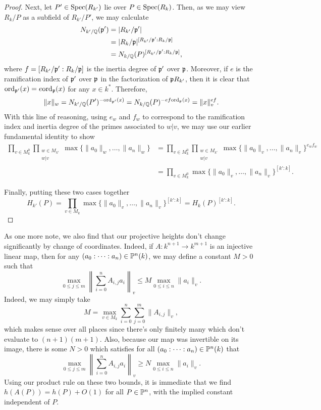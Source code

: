 \begin{proof}
    Next, let $P' \in {\rm Spec}(R_{k'})$ lie over $P \in {\rm Spec}(R_k)$.
    Then, as we may view $R_k / P$ as a subfield of $R_{k'} / P'$,
        we may calculate
    \begin{align*}
        N_{k' / \mathbb{Q}}(\mathfrak{p}')
        & = |R_{k'} / \mathfrak{p}'| \\
        & = |R_k / \mathfrak{p}|^{[R_{k'} / \mathfrak{p}' : R_k / \mathfrak{p}]} \\
        & = N_{k / \mathbb{Q}}(P)^{[R_{k'} / \mathfrak{p}' : R_k / \mathfrak{p}]},
    \end{align*}
    where $f = [R_{k'} / \mathfrak{p}' : R_k / \mathfrak{p}]$ is the inertia degree of $\mathfrak{p}'$ over $\mathfrak{p}$.
    Moreover, if $e$ is the ramification index of $\mathfrak{p}'$ over $\mathfrak{p}$ in the factorization of $\mathfrak{p} R_{k'}$,
    then it is clear that ${\rm ord}_{\mathfrak{p}'}(x) = e {\rm ord}_{\mathfrak{p}}(x)$ for any $x \in k^*$.
    Therefore,
    \[
        \|x\|_w
        = N_{k' / \mathbb{Q}}(P')^{-{\rm ord}_{\mathfrak{p}'}(x)}
        = N_{k / \mathbb{Q}}(P)^{-ef{\rm ord}_{\mathfrak{p}}(x)}
        = \|x\|_v^{ef}.
    \]
    With this line of reasoning, using $e_w$ and $f_w$ to correspond to the ramification index and inertia degree of the primes associated to $w|v$,
    we may use our earlier fundamental identity to show
    \begin{align*}
        \prod_{v \in M_k^0} \prod_{\substack{ w \in M_{k'} \\ w | v}}
        \max\{\|a_0\|_w, \ldots, \|a_n\|_w\}
        & = \prod_{v \in M_k^0} \prod_{\substack{ w \in M_{k'} \\ w | v}}
            \max\{\|a_0\|_v, \ldots, \|a_n\|_v\}^{e_w f_w} \\
        & = \prod_{v \in M_k^0 } \max\{\|a_0\|_v, \ldots, \|a_n\|_v\}^{[k' : k]}.
    \end{align*}

    Finally, putting these two cases together
    \[
        H_{k'}(P)
        = \prod_{v \in M_k } \max\{\|a_0\|_v, \ldots, \|a_n\|_v\}^{[k' : k]}
        = H_k(P)^{[k' : k]}.
    \]
\end{proof}

As one more note, we also find that our projective heights don't change significantly by change of coordinates.
Indeed, if $A : k^{n + 1} \to k^{m + 1}$ is an injective linear map, then for any $(a_0: \cdots : a_n) \in \mathbb{P}^n(k)$,
we may define a constant $M > 0$ such that
\[
    \max_{0 \leq j \leq m} \left\|\sum_{i = 0}^n A_{i,j} a_i\right\|_v \leq M \max_{0 \leq i \leq n} \|a_i\|_v.
\]
Indeed, we may simply take
\[
    M = \max_{v \in M_k} \sum_{i = 0}^n \sum_{j = 0}^m \|A_{i,j}\|_v,
\]
which makes sense over all places since there's only finitely many which don't evaluate to $(n + 1)(m +1)$.
Also, because our map was invertible on its image, there is some $N > 0$ which satisfies for all $(a_0: \cdots : a_n) \in \mathbb{P}^n(k)$ that
\[
    \max_{0 \leq j \leq m} \left\|\sum_{i = 0}^n A_{i,j} a_i\right\|_v \geq N \max_{0 \leq i \leq n} \|a_i\|_v.
\]
Using our product rule on these two bounds, 
it is immediate that we find $h(A(P)) = h(P) + O(1)$ for all $P \in \mathbb{P}^n$,
with the implied constant independent of $P$.
